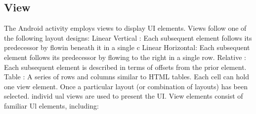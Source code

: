 \documentclass[twoside,a4paper,16pt]{book}
\begin{document}
\subsection{View}
The Android activity employs views to display UI elements. Views follow one of the following layout designs: 
Linear Vertical :
Each subsequent element follows its predecessor by flowin beneath it in a single c Linear Horizontal: Each subsequent element follows its predecessor by flowing to the right in a single row. 
Relative :
Each subsequent element is described in terms of offsets from the prior element. 
Table :
A series of rows and columns similar to HTML tables. Each cell can hold one view element. Once a particular layout (or combination of layouts) has been selected. individ ual views are used to present the UI. 
View elements consist of familiar Ul elements, including:\\ 
\end{document}
